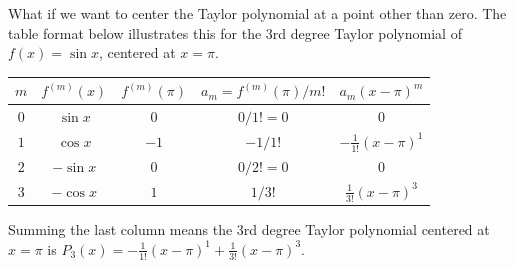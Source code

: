 What if we want to center the Taylor polynomial at a point other than zero. The table format below illustrates this for the 3rd degree Taylor polynomial of $f(x)=\sin x$, centered at $x=\pi$.
\begin{center}
\begin{tabular}{|c|c|c|c|c|}\hline
$m$ & $f^{(m)}(x)$ & $f^{(m)}(\pi)$ & $a_m=f^{(m)}(\pi)/m!$  & $a_m (x-\pi)^m$
\\\hline
$0$ & $\sin x$ & $0$ & $0/1!=0$ & $0$
\\\hline
$1$ & $\cos x$ & $-1$ & $-1/1!$ & $-\frac{1}{1!}(x-\pi)^1$
\\\hline
$2$ & $-\sin x$ & $0$ & $0/2!=0$ & $0$
\\\hline
$3$ & $-\cos x$ & $1$ & $1/3!$ & $\frac{1}{3!}(x-\pi)^3$
\\\hline
\end{tabular}
\end{center}
Summing the last column means the 3rd degree Taylor polynomial centered at $x=\pi$ is $P_3(x) = -\frac{1}{1!}(x-\pi)^1 + \frac{1}{3!}(x-\pi)^3$.

